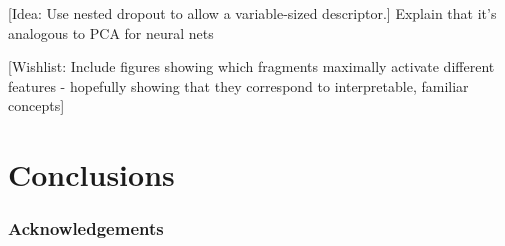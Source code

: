 \documentclass{article}
\begin{document}
[Idea: Use nested dropout to allow a variable-sized descriptor.]
Explain that it's analogous to PCA for neural nets


[Wishlist: Include figures showing which fragments maximally activate different features - hopefully showing that they correspond to interpretable, familiar concepts]


\section{Conclusions}


\subsubsection*{Acknowledgements}



\end{document}
